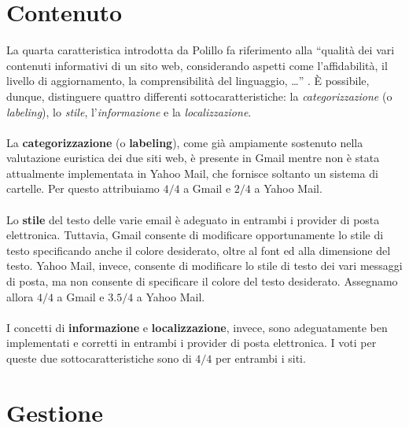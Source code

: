 	\section{Contenuto} \label{sec:contenuto}
	
		La quarta caratteristica introdotta da Polillo fa riferimento alla ``qualità dei vari contenuti informativi di un sito web, considerando aspetti come l'affidabilità, il livello di aggiornamento, la comprensibilità del linguaggio, \dots'' \cite{polillo:modello}. È possibile, dunque, distinguere quattro differenti sottocaratteristiche: la \textit{categorizzazione} (o \textit{labeling}), lo \textit{stile}, l'\textit{informazione} e la \textit{localizzazione}.\\
		\\
		La \textbf{categorizzazione} (o \textbf{labeling}), come già ampiamente sostenuto nella valutazione euristica dei due siti web, è presente in Gmail mentre non è stata attualmente implementata in Yahoo Mail, che fornisce soltanto un sistema di cartelle. Per questo attribuiamo $4/4$ a Gmail e $2/4$ a Yahoo Mail.\\
		\\
		Lo \textbf{stile} del testo delle varie email è adeguato in entrambi i provider di posta elettronica. Tuttavia, Gmail consente di modificare opportunamente lo stile di testo specificando anche il colore desiderato, oltre al font ed alla dimensione del testo. Yahoo Mail, invece, consente di modificare lo stile di testo dei vari messaggi di posta, ma non consente di specificare il colore del testo desiderato. Assegnamo allora $4/4$ a Gmail e $3.5/4$ a Yahoo Mail.\\
		\\
		I concetti di \textbf{informazione} e \textbf{localizzazione}, invece, sono adeguatamente ben implementati e corretti in entrambi i provider di posta elettronica. I voti per queste due sottocaratteristiche sono di $4/4$ per entrambi i siti.
	
	\section{Gestione} \label{sec:gestione}
	
